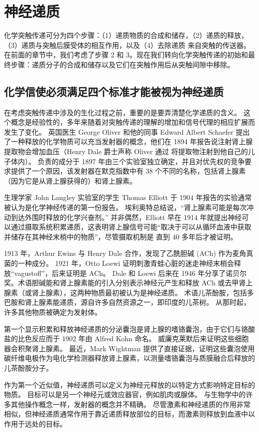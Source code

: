 \chapter{神经递质} \label{chap:chap16}
化学突触传递可分为四个步骤：（1）递质物质的合成和储存，（2）递质的释放，（3）递质与突触后膜受体的相互作用，以及（4）去除递质 来自突触的传送器。 在前面的章节中，我们考虑了步骤 2 和 3。现在我们转向化学突触传递的初始和最终步骤：递质分子的合成和储存以及它们在突触作用后从突触间隙中移除。

\section{化学信使必须满足四个标准才能被视为神经递质}
在考虑突触传递中涉及的生化过程之前，重要的是要弄清楚化学递质的含义。 这个概念是经验性的，多年来随着对突触传递的理解的增加和信号代理的相应扩展而发生了变化。 英国医生 George Oliver 和他的同事 Edward Albert Schaefer 提出了一种释放的化学物质可以充当发射器的概念，他们在 1894 年报告说注射肾上腺提取物会增加血压（Henry Dale 爵士声称 Oliver 通过 将提取物注射到他自己的儿子体内）。 负责的成分于 1897 年由三个实验室独立确定，并且对优先权的竞争要求提供了一个原因，该发射器在默克指数中有 38 个不同的名称，包括肾上腺素（因为它是从肾上腺获得的）和肾上腺素。

生理学家 John Langley 实验室的学生 Thomas Elliott 于 1904 年报告的实验通常被认为是化学神经传递的第一份报告。 埃利奥特总结说，“肾上腺素可能是每次冲动到达外围时释放的化学兴奋剂。” 并非偶然，Elliott 早在 1914 年就提出神经可以通过摄取系统积累递质，这表明肾上腺信号可能“取决于可以从循环血液中获取并储存在其神经末梢中的物质”，尽管摄取机制是 直到 40 多年后才被证明。

1913 年，Arthur Ewins 与 Henry Dale 合作，发现了乙酰胆碱 (ACh) 作为麦角真菌的一种成分。 1921 年，Otto Loewi 证明刺激青蛙心脏的迷走神经末梢会释放“vagustoff”，后来证明是 ACh。 Dale 和 Loewi 后来在 1946 年分享了诺贝尔奖。术语胆碱能和肾上腺素能的引入分别表示神经元产生和释放 ACh 或去甲肾上腺素（或肾上腺素），这两种物质最初被认为是神经递质。 术语儿茶酚胺，包括多巴胺和肾上腺素能递质，源自许多自然资源之一，即印度的儿茶树。 从那时起，许多其他物质被确定为发射体。

第一个显示积累和释放神经递质的分泌囊泡是肾上腺的嗜铬囊泡，由于它们与铬酸盐的比色反应而于 1902 年由 Alfred Kohn 命名。 威廉克莱默后来证明这些细胞器会积聚肾上腺素。 最近，Mark Wightman 提供了直接证据，证明这些囊泡使用碳纤维电极作为电化学检测器释放肾上腺素，以测量嗜铬囊泡与质膜融合后释放的儿茶酚胺分子。

作为第一个近似值，神经递质可以定义为神经元释放的以特定方式影响特定目标的物质。 目标可以是另一个神经元或效应器官，例如肌肉或腺体。 与生物学中的许多其他操作概念一样，发射器的概念并不精确。 尽管激素和神经递质的作用非常相似，但神经递质通常作用于靠近递质释放部位的目标，而激素则释放到血液中以作用于远处的目标。

